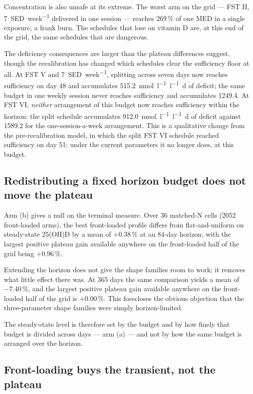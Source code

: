 \documentclass[11pt]{article}
\newcommand{\nmol}{\si{\nano\mole\per\litre}}
\newcommand{\SED}{SED}
\begin{document}
Concentration is also unsafe at its extreme. The worst arm on the grid
--- FST II, \SI{7}{\SED\per week} delivered in one session --- reaches
269\,\% of one MED in a single exposure, a frank burn. The
schedules that lose on vitamin D are, at this end of the grid, the
same schedules that are dangerous.

The deficiency consequences are larger than the plateau differences
suggest, though the recalibration has changed which schedules clear
the sufficiency floor at all. At FST V and \SI{7}{\SED\per week},
splitting across seven days now reaches sufficiency on day 48 and
accumulates \SI{515.2}{\nmol\per\litre\day} of deficit; the same
budget in one weekly session never reaches sufficiency and
accumulates \SI{1249.4}{}. At FST VI, \emph{neither} arrangement of
this budget now reaches sufficiency within the horizon: the split
schedule accumulates \SI{912.0}{\nmol\per\litre\day} of deficit
against \SI{1589.2}{} for the one-session-a-week arrangement. This is
a qualitative change from the pre-recalibration model, in which the
split FST VI schedule reached sufficiency on day 51; under the
current parameters it no longer does, at this budget.

\subsection{Redistributing a fixed horizon budget does not move the plateau}

Arm (b) gives a null on the terminal measure. Over 36 matched-N cells
(2052 front-loaded arms), the best front-loaded profile differs from
flat-and-uniform on steady-state 25(OH)D by a mean of $+0.38\,\%$ at
an 84-day horizon, with the largest positive plateau gain available
anywhere on the front-loaded half of the grid being $+0.96\,\%$.

Extending the horizon does not give the shape families room to work;
it removes what little effect there was. At 365 days the same
comparison yields a mean of $-7.40\,\%$, and the largest positive
plateau gain available anywhere on the front-loaded half of the grid
is $+0.00\,\%$. This forecloses the obvious objection that the
three-parameter shape families were simply horizon-limited.

The steady-state level is therefore set by the budget and by how
finely that budget is divided across days --- arm (a) --- and not by
how the same budget is arranged over the horizon.

\subsection{Front-loading buys the transient, not the plateau}
\end{document}
